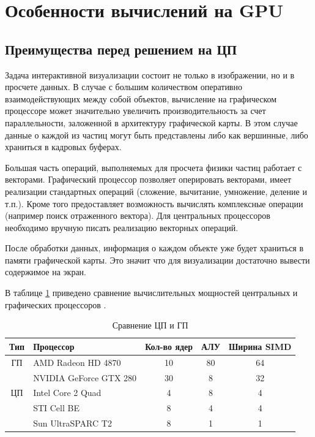 \newpage
\section{Особенности вычислений на GPU}

\subsection{Преимущества перед решением на ЦП}

Задача интерактивной визуализации состоит не только в изображении, но и в просчете данных.
В случае с большим количеством оперативно взаимодействующих между собой объектов, вычисление
на графическом процессоре может значительно увеличить производительность за счет параллельности,
заложенной в архитектуру графической карты. В этом случае данные о каждой из частиц могут быть
представлены либо как вершинные, либо храниться в кадровых буферах.

Большая часть операций, выполняемых для просчета физики частиц работает с векторами. Графический
процессор позволяет оперировать векторами, имеет реализации стандартных операций
(сложение, вычитание, умножение, деление и т.п.). Кроме того предоставляет возможность вычислять
комплексные операции (например поиск отраженного вектора). Для центральных процессоров необходимо 
вручную писать реализацию векторных операций.

После обработки данных, информация о каждом объекте уже будет храниться в памяти графической карты.
Это значит что для визуализации достаточно вывести содержимое на экран.

В таблице \ref{tab:cpugpu} приведено сравнение вычислительных мощностей центральных и графических
процессоров \cite{gpu}.

\begin{table}[h!]
  \caption{\label{tab:cpugpu} Сравнение ЦП и ГП}
  \begin{center}
    \begin{tabular}{|c|l|c|c|c|}
      \hline
      Тип & Процессор & Кол-во ядер & АЛУ & Ширина SIMD \\
      \hline
      ГП & AMD Radeon HD 4870 & 10 & 80 & 64 \\
         & NVIDIA GeForce GTX 280 & 30 & 8 & 32 \\
      \hline
      ЦП & Intel Core 2 Quad & 4 & 8 & 4 \\
         & STI Cell BE & 8 & 4 & 4 \\
         & Sun UltraSPARC T2 & 8 & 1 & 1 \\
      \hline
    \end{tabular}
  \end{center}
\end{table}

